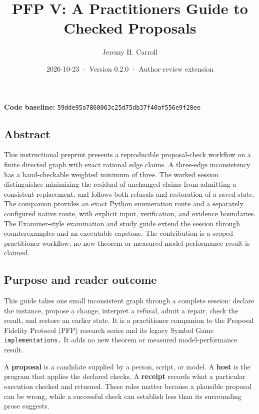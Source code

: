 \documentclass[
  11pt,
]{article}
\title{PFP V: A Practitioner\textquotesingle s Guide to Checked
Proposals}
\author{Jeremy H. Carroll}
\date{2026-10-23 · Version 0.2.0 · Author-review extension}
\begin{document}
\makeatletter
\begin{center}
{\LARGE \@title\par}
\vspace{0.8em}
{\normalsize \@author\par}
\vspace{0.5em}
{\small \@date\par}
\end{center}
\makeatother

\textbf{Code baseline:}
\nolinkurl{59dde95a7860063c25d75db37f40af556e9f28ee}

\subsection{Abstract}\label{abstract}

This instructional preprint presents a reproducible proposal-check
workflow on a finite directed graph with exact rational edge claims. A
three-edge inconsistency has a hand-checkable weighted minimum of three.
The worked session distinguishes minimizing the residual of unchanged
claims from admitting a consistent replacement, and follows both
refusals and restoration of a saved state. The companion provides an
exact Python enumeration route and a separately configured native route,
with explicit input, verification, and evidence boundaries. The
Examiner-style examination and study guide extend the session through
counterexamples and an executable capstone. The contribution is a scoped
practitioner workflow; no new theorem or measured model-performance
result is claimed.

\subsection{Purpose and reader
outcome}\label{purpose-and-reader-outcome}

This guide takes one small inconsistent graph through a complete
session: declare the instance, propose a change, interpret a refusal,
admit a repair, check the result, and restore an earlier state. It is a
practitioner companion to the Proposal Fidelity Protocol (PFP) research
series and its legacy Symbol Game \nolinkurl{implementations.} It adds
no new theorem or measured model-performance result.

A \textbf{proposal} is a candidate supplied by a person, script, or
model. A \textbf{host} is the program that applies the declared checks.
A \textbf{receipt} records what a particular execution checked and
returned. These roles matter because a plausible proposal can be wrong,
while a successful check can establish less than its surrounding prose
suggests.
\end{document}
